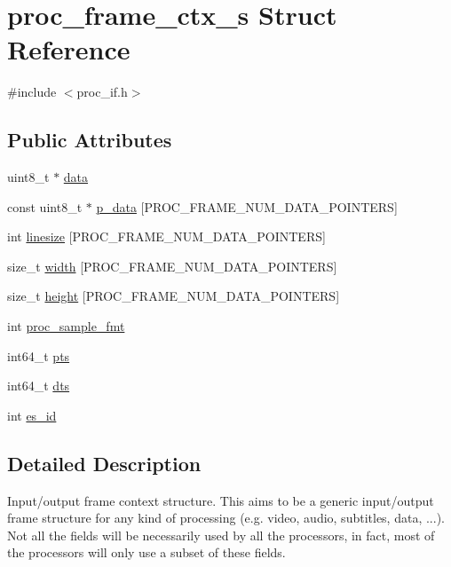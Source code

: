 \hypertarget{structproc__frame__ctx__s}{}\section{proc\+\_\+frame\+\_\+ctx\+\_\+s Struct Reference}
\label{structproc__frame__ctx__s}


{\ttfamily \#include $<$proc\+\_\+if.\+h$>$}

\subsection*{Public Attributes}
\begin{DoxyCompactItemize}
\item 
uint8\+\_\+t $\ast$ \hyperlink{structproc__frame__ctx__s_ae3e8c9753324e6798ef8613fd3e772d2}{data}
\item 
const uint8\+\_\+t $\ast$ \hyperlink{structproc__frame__ctx__s_ac6381b5fe9fa44fc575ab35a12e19a50}{p\+\_\+data} \mbox{[}P\+R\+O\+C\+\_\+\+F\+R\+A\+M\+E\+\_\+\+N\+U\+M\+\_\+\+D\+A\+T\+A\+\_\+\+P\+O\+I\+N\+T\+E\+RS\mbox{]}
\item 
int \hyperlink{structproc__frame__ctx__s_a68abb3bc396beba4b30cd13b2bcc8eda}{linesize} \mbox{[}P\+R\+O\+C\+\_\+\+F\+R\+A\+M\+E\+\_\+\+N\+U\+M\+\_\+\+D\+A\+T\+A\+\_\+\+P\+O\+I\+N\+T\+E\+RS\mbox{]}
\item 
size\+\_\+t \hyperlink{structproc__frame__ctx__s_ae6221b8581a9b08b7fceaa08050dbeb5}{width} \mbox{[}P\+R\+O\+C\+\_\+\+F\+R\+A\+M\+E\+\_\+\+N\+U\+M\+\_\+\+D\+A\+T\+A\+\_\+\+P\+O\+I\+N\+T\+E\+RS\mbox{]}
\item 
size\+\_\+t \hyperlink{structproc__frame__ctx__s_ab3f274e1a3c0df994275d29d7fce36da}{height} \mbox{[}P\+R\+O\+C\+\_\+\+F\+R\+A\+M\+E\+\_\+\+N\+U\+M\+\_\+\+D\+A\+T\+A\+\_\+\+P\+O\+I\+N\+T\+E\+RS\mbox{]}
\item 
int \hyperlink{structproc__frame__ctx__s_aa68098f554e8a167b34d8454af44afda}{proc\+\_\+sample\+\_\+fmt}
\item 
int64\+\_\+t \hyperlink{structproc__frame__ctx__s_ab08e6752be55e23d4a37ec37931a30b9}{pts}
\item 
int64\+\_\+t \hyperlink{structproc__frame__ctx__s_a7300cb89fc1872dbcad499aa4d8435dd}{dts}
\item 
int \hyperlink{structproc__frame__ctx__s_a457dcb8ae6440506054f07483f48be1f}{es\+\_\+id}
\end{DoxyCompactItemize}


\subsection{Detailed Description}
Input/output frame context structure. This aims to be a generic input/output frame structure for any kind of processing (e.\+g. video, audio, subtitles, data, ...). Not all the fields will be necessarily used by all the processors, in fact, most of the processors will only use a subset of these fields. 

